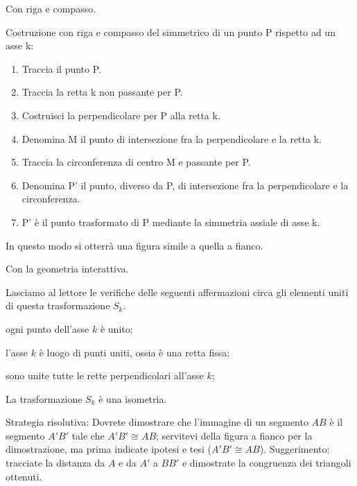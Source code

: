 Con riga e compasso.

\begin{procedura}
  Costruzione con riga e compasso del simmetrico di un punto P rispetto ad un 
asse k:
  \begin{enumerate} [nosep]
    \item 
    Traccia il punto P.
    \item 
    Traccia la retta k non passante per P.
    \item 
    Costruisci la perpendicolare per P alla retta k.
    \item 
    Denomina M il punto di intersezione fra la perpendicolare e la retta k.
    \item 
    Traccia la circonferenza di centro M e passante per P.
    \item 
    Denomina P' il punto, diverso da P, di intersezione fra la perpendicolare e 
la circonferenza. 
    \item 
    P' è il punto trasformato di P mediante la simmetria assiale di asse k.
  \end{enumerate}
\end{procedura}
In questo modo si otterrà una figura simile a quella a fianco.

Con la geometria interattiva.



Lasciamo al lettore le verifiche delle seguenti affermazioni circa 
gli elementi uniti di questa trasformazione $S_k$.
\begin{itemize*}
\item ogni punto dell'asse $k$ è unito;
\item l'asse $k$ è luogo di punti uniti, ossia è una retta fissa;
\item sono unite tutte le rette perpendicolari all'asse $k$;
\end{itemize*}
\setlength{\intextsep}{\defintextsep}

\begin{teorema}\label{teo:8.3}
La trasformazione $S_k$ è una isometria.
\end{teorema}

\noindent\begin{minipage}{0.65\textwidth}\parindent15pt
Strategia risolutiva:
Dovrete dimostrare che l'immagine di un segmento $AB$ è il segmento 
$A'B'$ tale che $A'B'\cong AB$; servitevi della figura a fianco per 
la dimostrazione, ma prima indicate ipotesi e tesi ($A'B'\cong AB$).
Suggerimento: tracciate la distanza da $A$ e da $A'$ a $BB'$ e 
dimostrate la congruenza dei triangoli ottenuti.
\end{minipage}\hfil
\begin{minipage}{0.35\textwidth}
  \centering
\end{minipage}\vspace{5pt}

